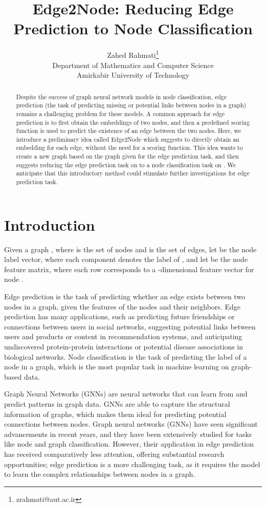 \documentclass{article}
\title{Edge2Node: Reducing Edge Prediction to Node Classification
}
\author{
  Zahed Rahmati\thanks{zrahmati@aut.ac.ir}\\Department of Mathematics and Computer Science\\Amirkabir University of Technology 
}
\begin{document}
\maketitle


\begin{abstract}
Despite the success of graph neural network models in node classification, edge prediction (the task of predicting missing or potential links between nodes in a graph) remains a challenging problem for these models.
A common approach for edge prediction is to first obtain the embeddings of two nodes, and then a predefined scoring function is used to predict the existence of an edge between the two nodes.  
Here, we introduce a preliminary idea called Edge2Node which suggests to directly obtain an embedding for each edge, without the need for a scoring function. This idea wants to create a new graph  based on the graph  given for the edge prediction task, and then suggests reducing the edge prediction task on  to a node classification task on . We anticipate that this introductory method could stimulate further investigations for edge prediction task.
\end{abstract}



\section{Introduction}
Given a graph , where  is the set of nodes and  is the set of edges, let  be the node label vector, where each component  denotes the label of , and let  be the node feature matrix, where each row  corresponds to a -dimensional feature vector for node . 

Edge prediction is the task of predicting whether an edge exists between two nodes in a graph, given the features of the nodes and their neighbors.
Edge prediction has many applications, such as predicting future friendships or connections between users in social networks, suggesting potential links between users and products or content in recommendation systems, and anticipating undiscovered protein-protein interactions or potential disease associations in biological networks. Node classification is the task of predicting the label of a node in a graph, which is the most popular task in machine learning on graph-based data.

Graph Neural Networks (GNNs) are neural networks that can learn from and predict patterns in graph data. GNNs are able to capture the structural information of graphs, which makes them ideal for predicting potential connections between nodes. Graph neural networks (GNNs) have seen significant advancements in recent years, and they have been extensively studied for tasks like node and graph classification. However, their application in edge prediction has received comparatively less attention, offering substantial research opportunities; edge prediction is a more challenging task, as it requires the model to learn the complex relationships between nodes in a graph.
\end{document}
